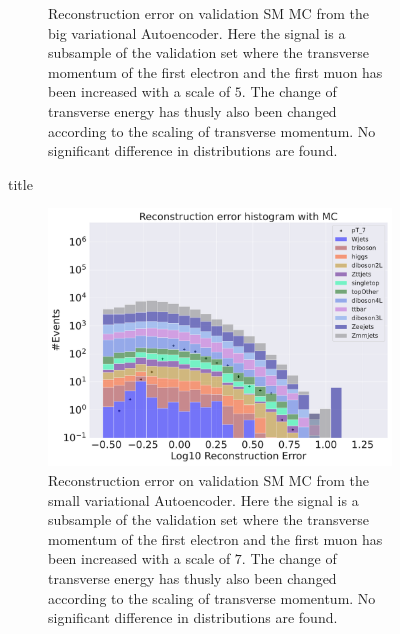 \begin{figure}[h!]
\begin{subfigure}{.45\textwidth}
        \caption{Reconstruction error on validation SM MC from the big variational Autoencoder. Here the signal is a subsample of the validation 
        set where the transverse momentum of the first electron and the first muon has been increased with a scale of $5$. The change of transverse 
        energy has thusly also been changed according to the scaling of transverse momentum. No significant difference in distributions are found. }
        \label{fig:VAE_big_pt_5}
    \end{subfigure}
    \hfill 
    \caption{title}
    \label{fig:VAE_big_small_pt_5}
\end{figure}


\begin{figure}[h!]
    \centering
    \begin{subfigure}{.45\textwidth}
        \includegraphics[width=\textwidth]{Figures/VAE_testing/small/b_data_recon_big_rm3_feats_sig_pT_7.pdf}
        \caption{Reconstruction error on validation SM MC from the small variational Autoencoder. Here the signal is a subsample of the validation 
        set where the transverse momentum of the first electron and the first muon has been increased with a scale of $7$. The change of transverse 
        energy has thusly also been changed according to the scaling of transverse momentum. No significant difference in distributions are found. }
        \label{fig:VAE_small_pt_7}
    \end{subfigure}
    \hfill 
    \begin{subfigure}{.45\textwidth}

\end{subfigure}
\end{figure}
